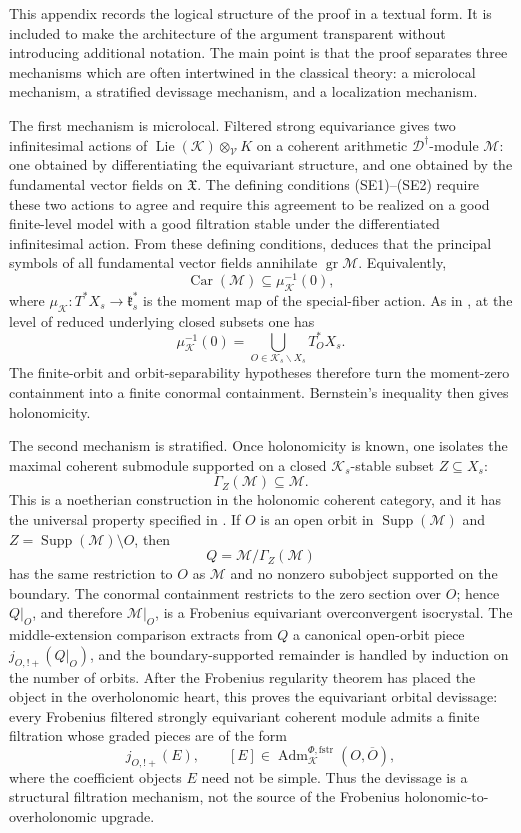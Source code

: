 \documentclass[11pt]{amsart}
\theoremstyle{plain}
\theoremstyle{definition}
\theoremstyle{remark}
\newcommand{\Car}{\operatorname{Car}}
\newcommand{\Supp}{\operatorname{Supp}}
\newcommand{\fstr}{\mathrm{fstr}}
\newcommand{\Adm}{\operatorname{Adm}}
\begin{document}
This appendix records the logical structure of the proof in a textual form.
It is included to make the architecture of the argument transparent without
introducing additional notation.  The main point is that the proof separates
three mechanisms which are often intertwined in the classical theory: a
microlocal mechanism, a stratified devissage mechanism, and a localization
mechanism.

The first mechanism is microlocal.  Filtered strong equivariance gives two
infinitesimal actions of \(\operatorname{Lie}(\mathcal K)\otimes_{\mathcal V}K\)
on a coherent arithmetic \(\mathscr D^\dagger\)-module \(\mathcal M\): one
obtained by differentiating the equivariant structure, and one obtained by the
fundamental vector fields on \(\mathfrak X\).  The defining conditions
\textup{(SE1)--(SE2)} require these two actions to agree and require this
agreement to be realized on a good finite-level model with a good filtration
stable under the differentiated infinitesimal action.  From these defining
conditions,  deduces that the principal
symbols of all fundamental vector fields annihilate
\(\operatorname{gr}\mathcal M\).  Equivalently,
\[
  \Car(\mathcal M)
  \subseteq
  \mu_{\mathcal K}^{-1}(0),
\]
where \(\mu_{\mathcal K}:T^*X_s\to\mathfrak k_s^*\) is the moment map of the
special-fiber action.  As in , at the level of reduced underlying
closed subsets one has
\[
  \mu_{\mathcal K}^{-1}(0)
  =
  \bigcup_{O\in\mathcal K_s\backslash X_s}T^*_O X_s.
\]
The finite-orbit and orbit-separability hypotheses therefore turn the moment-zero containment into a
finite conormal containment.  Bernstein's inequality then gives holonomicity.

The second mechanism is stratified.  Once holonomicity is known, one isolates the maximal coherent submodule
supported on a closed \(\mathcal K_s\)-stable subset \(Z\subseteq X_s\):
\[
  \Gamma_Z(\mathcal M)\subseteq \mathcal M.
\]
This is a noetherian construction in the holonomic coherent category, and it has
the universal property specified in .  If \(O\) is
an open orbit in \(\Supp(\mathcal M)\) and
\(Z=\Supp(\mathcal M)\setminus O\), then
\[
  Q=\mathcal M/\Gamma_Z(\mathcal M)
\]
has the same restriction to \(O\) as \(\mathcal M\) and no nonzero subobject
supported on the boundary.  The conormal containment restricts to the zero
section over \(O\); hence \(Q|_O\), and therefore \(\mathcal M|_O\), is a
Frobenius equivariant overconvergent isocrystal.  The middle-extension
comparison extracts from \(Q\) a canonical open-orbit piece
\(j_{O,!+}(Q|_O)\), and the boundary-supported remainder is handled by induction
on the number of orbits.  After the Frobenius regularity theorem has placed the
object in the overholonomic heart, this proves the equivariant orbital
devissage: every Frobenius filtered strongly equivariant coherent module admits
a finite filtration whose graded pieces are of the form
\[
  j_{O,!+}(E),
  \qquad
  [E]\in
  \Adm^{\Phi,\fstr}_{\mathcal K}(O,\overline O),
\]
where the coefficient objects \(E\) need not be simple.  Thus the devissage is
a structural filtration mechanism, not the source of the Frobenius
holonomic-to-overholonomic upgrade.
\end{document}
